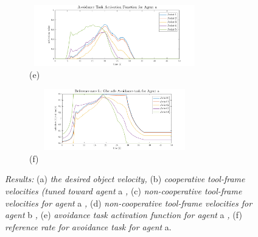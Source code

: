 \documentclass[a4paper, 12pt, notitlepage]{article}
\begin{document}
\begin{multicols}{2}
		\setcounter{figure}{6}
		\begin{figure}[t!]
			
			\begin{subfigure}{.5\linewidth}
				\hspace{-30px}
				\includegraphics[width=280px,height=100px]{ActivationFunction}
				\caption{\hspace{-15px}(e)}
				\label{fig::e}
			\end{subfigure}
			\hfill
			\begin{subfigure}{.5\linewidth}
				\hspace{-10px}
				\includegraphics[width=280px,height=100px]{RefObstaclea}
				\caption{\hspace{25px}(f)}
				\label{fig::f}
			\end{subfigure}
			
			\caption{\small \textit{Results: }(a)\textit{ the desired object velocity, }(b)\textit{ cooperative tool-frame velocities (tuned toward agent} a \textit{, }(c)\textit{ non-cooperative tool-frame velocities for agent} a \textit{, }(d)\textit{ non-cooperative tool-frame velocities for agent} b \textit{, }(e)\textit{ avoidance task activation function for agent} a \textit{, }(f)\textit{ reference rate for avoidance task for agent} a.}
			
			\label{fig::results}
		\end{figure}
		

\end{multicols}
\end{document}
